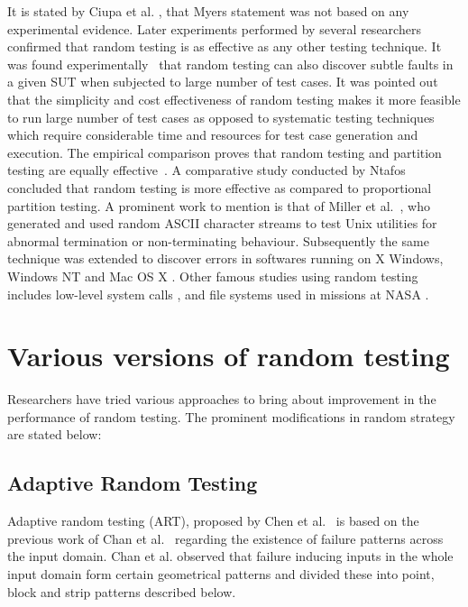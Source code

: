 It is stated by Ciupa et al. \cite{Ciupa2007}, that Myers statement was not based on any experimental evidence. Later experiments performed by several researchers~\cite{hamlet1994, Ciupa2008, leitner2007efficient, Duran1981} confirmed that random testing is as effective as any other testing technique. It was found experimentally~\cite{Duran1981} that random testing can also discover subtle faults in a given SUT when subjected to large number of test cases. It was pointed out that the simplicity and cost effectiveness of random testing makes it more feasible to run large number of test cases as opposed to systematic testing techniques which require considerable time and resources for test case generation and execution. The empirical comparison proves that random testing and partition testing are equally effective~\cite{hamlet1990}. A comparative study conducted by Ntafos~\cite{ntafos1998random} concluded that random testing is more effective as compared to proportional partition testing. A prominent work to mention is that of Miller et al.~\cite{miller1990empirical}, who generated and used random ASCII character streams to test Unix utilities for abnormal termination or non-terminating behaviour. Subsequently the same technique was extended to discover errors in softwares running on X Windows, Windows NT and Mac OS X \cite{forrester2000empirical, miller2006empirical}. Other famous studies using random testing includes low-level system calls \cite{kropp1998automated}, and file systems used in missions at NASA \cite{groce2007randomized}.


\section{Various versions of random testing}
Researchers have tried various approaches to bring about improvement in the performance of random testing. The prominent modifications in random strategy are stated below:

\subsection{Adaptive Random Testing}
Adaptive random testing (ART), proposed by Chen et al.~\cite{Chen2008} is based on the previous work of Chan et al.~\cite{Chan1996} regarding the existence of failure patterns across the input domain. Chan et al. observed that failure inducing inputs in the whole input domain form certain geometrical patterns and divided these into point, block and strip patterns described below.

